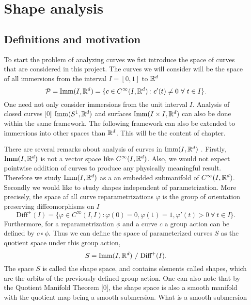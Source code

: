
\section{Shape analysis}
\subsection{Definitions and motivation}
To start the problem of analyzing curves we fist introduce the space of curves that are considered in this project. The curves we will consider will be the space of all immersions from the interval  \(I = [0, 1]\) to  \(\mathbb{R}^d\)
\begin{equation}
  \mathcal{P}= \text{Imm}(I, \mathbb{R}^d) = \{c \in C^{\infty}(I, \mathbb{R}^d) :  c'(t) \neq  0 \ \forall \ t \in I  \}.
\end{equation}
One need not only consider immersions from the unit interval  \(I\). Analysis of closed curves [0]  \(\text{Imm}(S^1, \mathbb{R}^d)\) and surfaces  \(\text{Imm}(I \times I, \mathbb{R}^d)\) can also be done within the same framework. %
The following framework can also be extended to immersions into other spaces than  \(\mathbb{R}^d\). This will be the content of chapter.

There are several remarks about analysis of curves in  \(\text{Imm}(I, \mathbb{R}^d)\) . Firstly,  \(\text{Imm}(I, \mathbb{R}^d)\) is not a vector space like  \(C^{\infty}(I, \mathbb{R}^d)\). Also, we would not expect pointwise addition of curves to produce any physically meaningful result. Therefore we study  \(\text{Imm}(I, \mathbb{R}^d)\) as a an embedded submanifold of  \(C^{\infty}(I, \mathbb{R}^d)\). Secondly we would like to study shapes independent of parametrization. More precisely, the space af all curve reparametrizations   \(\varphi\) is the group of orientation preserving diffeomorphisms on  \(I\)
\begin{equation}
  \text{Diff}^+(I) = \{\varphi \in C^{\infty}(I,I): \varphi(0) = 0, \varphi(1) = 1, \varphi'(t) > 0 \ \forall \ t \in I \}.
\end{equation}
Furthermore, for a reparametrization  \(\phi \) and a curve  \(c\) a group action can be defined by  \(c \circ \phi\). Thus we can define the space of parameterized curves  \(S\) as the quotient space under this group action,
\begin{equation}
  S = {\text{Imm}(I, \R^d)} \ / \ {\text{Diff}^+(I)}.
\end{equation}
The space  \(S\) is called the shape space, and contains elements called shapes, which are the orbits of the previously defined group action. One can also note that by the Quotient Manifold Theorem [0], the shape space is also a smooth manifold with the quotient map being a smooth submersion. What is a smooth submersion

